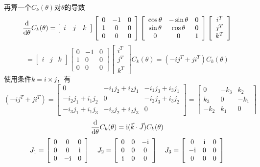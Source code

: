 再算一个$C_k(\theta)$对$\theta$的导数
$$\frac{\mathrm{d}}{\mathrm{d}\theta}C_k(\theta)=\left[\begin{array}{ccc}
    i&j&k
\end{array}\right]\left[\begin{array}{ccc}
        0&-1&0\\
        1&0&0\\
        0&0&0
    \end{array}\right]\left[\begin{array}{ccc}
        \cos\theta&-\sin\theta&0\\
        \sin\theta&\cos\theta&0\\
        0&0&1
    \end{array}\right]\left[\begin{array}{c}
    i^T\\
    j^T\\
    k^T
\end{array}\right]$$
$$=\left[\begin{array}{ccc}
    i&j&k
\end{array}\right]\left[\begin{array}{ccc}
        0&-1&0\\
        1&0&0\\
        0&0&0
    \end{array}\right]\left[\begin{array}{c}
    i^T\\
    j^T\\
    k^T
\end{array}\right]C_k(\theta)=(-ij^T+ji^T)C_k(\theta)$$
使用条件$k=i\times j$，有
$$(-ij^T+ji^T)=\left[\begin{array}{ccc}
    0&-i_1j_2+i_2j_1&-i_1j_3+i_3j_1\\
    -i_2j_1+i_1j_2&0&-i_2j_3+i_3j_2\\
    -i_3j_1+i_1j_3&-i_3j_2+i_2j_3&0
\end{array}\right]=\left[\begin{array}{ccc}
    0&-k_3&k_2\\
    k_3&0&-k_1\\
    -k_2&k_1&0
\end{array}\right]$$
$$\frac{\mathrm{d}}{\mathrm{d}\theta}C_k(\theta)=\mathrm{i}(\vec{k}\cdot\vec{J})C_k(\theta)$$
$$J_1=\left[\begin{array}{ccc}
    0&0&0\\
    0&0&\mathrm{i}\\
    0&-\mathrm{i}&0
\end{array}\right]\quad J_2=\left[\begin{array}{ccc}
    0&0&-\mathrm{i}\\
    0&0&0\\
    \mathrm{i}&0&0
\end{array}\right]\quad J_3=\left[\begin{array}{ccc}
    0&\mathrm{i}&0\\
    -\mathrm{i}&0&0\\
    0&0&0
\end{array}\right]$$
